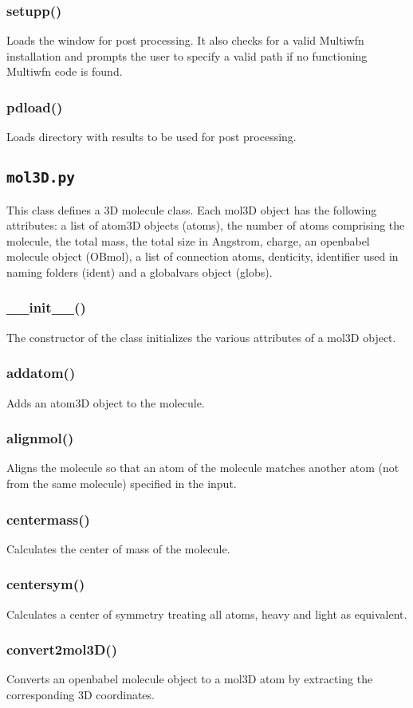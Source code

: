 \documentclass[a4paper,12pt]{assignment}
\begin{document}
\subsubsection{setupp()}
Loads the window for post processing. It also checks for a valid Multiwfn installation and prompts the user to specify a valid path if no functioning Multiwfn code is found.
\subsubsection{pdload()}
Loads directory with results to be used for post processing.
\subsection{\texttt{mol3D.py}}
This class defines a 3D molecule class. Each mol3D object has the following attributes: a list of atom3D objects (atoms), the number of atoms comprising the molecule, the total mass, the total size in Angstrom, charge, an openbabel molecule object (OBmol), a list of connection atoms, denticity, identifier used in naming folders (ident) and a globalvars object (globs). 
\subsubsection{\_\_init\_\_()}
The constructor of the class initializes the various attributes of a mol3D object.
\subsubsection{addatom()}
Adds an atom3D object to the molecule.
\subsubsection{alignmol()}
Aligns the molecule so that an atom of the molecule matches another atom (not from the same molecule) specified in the input.
\subsubsection{centermass()}
Calculates the center of mass of the molecule.
\subsubsection{centersym()}
Calculates a center of symmetry treating all atoms, heavy and light as equivalent.
\subsubsection{convert2mol3D()}
Converts an openbabel molecule object to a mol3D atom by extracting the corresponding 3D coordinates.
\end{document}
